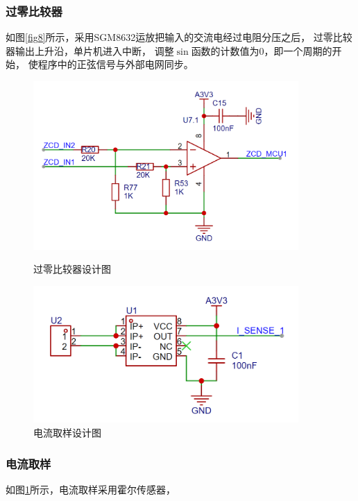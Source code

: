\documentclass[a4paper,12pt]{article}
\begin{document}
\subsubsection{过零比较器}
如图\ref{fig8}所示，采用SGM8632运放把输入的交流电经过电阻分压之后，
过零比较器输出上升沿，单片机进入中断，
调整$\sin$函数的计数值为0，即一个周期的开始，
使程序中的正弦信号与外部电网同步。


\begin{figure}[htbp]
    \centering
    \begin{minipage}{0.45\textwidth}
        \centering
        \includegraphics[width=0.9\textwidth]{src/fig8.png}
        \caption{过零比较器设计图}
        \label{fig8}
    \end{minipage}
    \qquad
    \begin{minipage}{0.45\textwidth}
        \centering
        \includegraphics[width=0.9\textwidth]{src/fig11.png}
        \caption{电流取样设计图}
        \label{fig11}
    \end{minipage}
\end{figure}
\subsubsection{电流取样}
如图\ref{fig11}所示，电流取样采用霍尔传感器，
\end{document}
